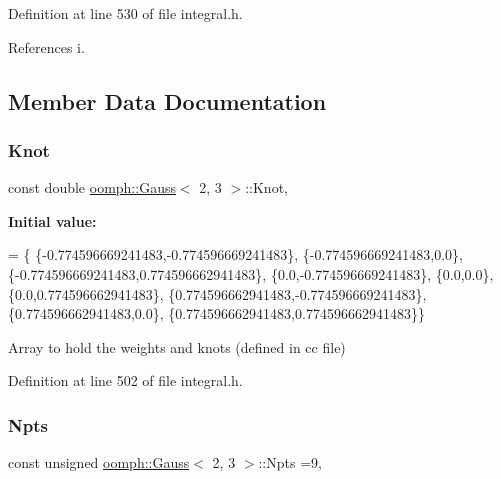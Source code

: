 Definition at line 530 of file integral.\+h.



References i.



\subsection{Member Data Documentation}
\mbox{\label{classoomph_1_1Gauss_3_012_00_013_01_4_ac6dccf63e4d699385004202956ebea97}} 
\subsubsection{\texorpdfstring{Knot}{Knot}}
{\footnotesize\ttfamily const double \hyperlink{classoomph_1_1Gauss}{oomph\+::\+Gauss}$<$ 2, 3 $>$\+::Knot\hspace{0.3cm}{\ttfamily [static]}, {\ttfamily [private]}}

{\bfseries Initial value\+:}
\begin{DoxyCode}
= \{
  \{-0.774596669241483,-0.774596669241483\},
  \{-0.774596669241483,0.0\},
  \{-0.774596669241483,0.774596662941483\},
  \{0.0,-0.774596669241483\},
  \{0.0,0.0\},
  \{0.0,0.774596662941483\},
  \{0.774596662941483,-0.774596669241483\},
  \{0.774596662941483,0.0\},
  \{0.774596662941483,0.774596662941483\}\}
\end{DoxyCode}


Array to hold the weights and knots (defined in cc file) 



Definition at line 502 of file integral.\+h.

\mbox{\label{classoomph_1_1Gauss_3_012_00_013_01_4_a3bf464fda1f207de75b487283cb9ffbb}} 
\subsubsection{\texorpdfstring{Npts}{Npts}}
{\footnotesize\ttfamily const unsigned \hyperlink{classoomph_1_1Gauss}{oomph\+::\+Gauss}$<$ 2, 3 $>$\+::Npts =9\hspace{0.3cm}{\ttfamily [static]}, {\ttfamily [private]}}



